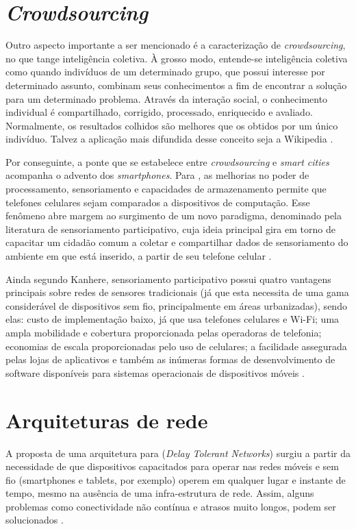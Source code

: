 \section{\textit{Crowdsourcing}}

Outro aspecto importante  a ser mencionado é a caracterização de \emph{crowdsourcing}, no que tange inteligência coletiva. À grosso modo, entende-se inteligência coletiva como quando indivíduos de um determinado grupo, que possui interesse por determinado assunto, combinam seus conhecimentos a fim de encontrar a solução para um determinado problema.  Através da interação social, o conhecimento individual é compartilhado, corrigido, processado, enriquecido e avaliado. Normalmente, os resultados colhidos são melhores que os obtidos por um único indivíduo. Talvez a aplicação mais difundida desse conceito seja a Wikipedia  \cite{schuurman}. 

Por conseguinte, a ponte que se estabelece entre \emph{crowdsourcing} e \emph{smart cities} acompanha o advento dos \textit{smartphones}. Para , as melhorias no poder de processamento, sensoriamento e capacidades de armazenamento permite que telefones celulares sejam comparados a dispositivos de computação. Esse fenômeno abre margem ao surgimento de um novo paradigma, denominado pela literatura de sensoriamento participativo, cuja ideia principal gira em torno de capacitar um cidadão comum a coletar e compartilhar dados de sensoriamento do ambiente em que está inserido, a partir de seu telefone celular \cite{kanhere}.

Ainda segundo Kanhere, sensoriamento participativo possui quatro vantagens principais sobre redes de sensores tradicionais (já que esta necessita de uma gama considerável de dispositivos sem fio, principalmente em áreas urbanizadas), sendo elas: custo de implementação baixo, já que usa telefones celulares e Wi-Fi; uma ampla mobilidade e cobertura proporcionada pelas operadoras de telefonia; economias de escala proporcionadas pelo uso de celulares; a facilidade assegurada pelas lojas de aplicativos e também as inúmeras formas de desenvolvimento de software disponíveis para sistemas operacionais de dispositivos móveis \cite{kanhere}. 

\section{Arquiteturas de rede}

A proposta de uma arquitetura para  (\emph{Delay Tolerant Networks}) surgiu a partir da necessidade de que dispositivos capacitados para operar nas redes móveis e sem fio (smartphones e tablets, por exemplo) operem em qualquer lugar e instante de tempo, mesmo na ausência de uma infra-estrutura de rede. Assim, alguns problemas como conectividade não contínua e atrasos muito longos, podem ser solucionados  \cite{vendramin2012c}.

